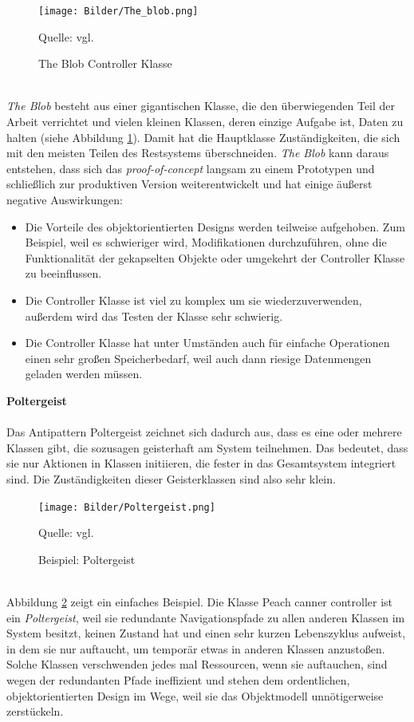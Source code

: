 \documentclass[fontsize=11pt,a4paper,final]{scrreprt}[2003/01/01]
\newcommand*{\quelle}{%
	\footnotesize Quelle: 
}
\begin{document}
\begin{figure}[H]
	\centering
	\texttt{[image: Bilder/The\_blob.png]}
	\caption{The Blob Controller Klasse}
	\quelle{vgl. \cite[S. 43]{Brown1998}}
	\label{fig:The_blob}
\end{figure} \ \\
\textit{The Blob} besteht aus einer gigantischen Klasse, die den überwiegenden Teil der Arbeit verrichtet und vielen kleinen Klassen, deren einzige Aufgabe ist, Daten zu halten (siehe Abbildung \ref{fig:The_blob}). Damit hat die Hauptklasse Zuständigkeiten, die sich mit den meisten Teilen des Restsystems überschneiden. \textit{The Blob} kann daraus entstehen, dass sich das \textit{proof-of-concept} langsam zu einem Prototypen und schließlich zur produktiven Version weiterentwickelt und hat einige äußerst negative Auswirkungen:
\begin{itemize}
	\item Die Vorteile des objektorientierten Designs werden teilweise aufgehoben. Zum Beispiel, weil es schwieriger wird, Modifikationen durchzuführen, ohne die Funktionalität der gekapselten Objekte oder umgekehrt der Controller Klasse zu beeinflussen.
	\item Die Controller Klasse ist viel zu komplex um sie wiederzuverwenden, außerdem wird das Testen der Klasse sehr schwierig.
	\item Die Controller Klasse hat unter Umständen auch für einfache Operationen einen sehr großen Speicherbedarf, weil auch dann riesige Datenmengen geladen werden müssen.
\end{itemize} \newpage \noindent
\textbf{Poltergeist \cite[S. 58 - 61]{Brown1998}} \\ \\
Das Antipattern Poltergeist zeichnet sich dadurch aus, dass es eine oder mehrere Klassen gibt, die sozusagen \glqq geisterhaft\grqq{} am System teilnehmen. Das bedeutet, dass sie nur Aktionen in Klassen initiieren, die fester in das Gesamtsystem integriert sind. Die Zuständigkeiten dieser \glqq Geisterklassen\grqq{} sind also sehr klein.

\begin{figure}[H]
	\centering
	\texttt{[image: Bilder/Poltergeist.png]}
	\caption{Beispiel: Poltergeist}
	\quelle{vgl. \cite[S. 59]{Brown1998}}
	\label{fig:Poltergeist}
\end{figure} \ \\
Abbildung \ref{fig:Poltergeist} zeigt ein einfaches Beispiel. Die Klasse \glqq Peach canner controller\grqq{} ist ein \textit{Poltergeist}, weil sie redundante Navigationspfade zu allen anderen Klassen im System besitzt, keinen Zustand hat und einen sehr kurzen Lebenszyklus aufweist, in dem sie nur auftaucht, um temporär etwas in anderen Klassen anzustoßen. Solche Klassen verschwenden jedes mal Ressourcen, wenn sie auftauchen, sind wegen der redundanten Pfade ineffizient und stehen dem ordentlichen, objektorientierten Design im Wege, weil sie das Objektmodell unnötigerweise zerstückeln. 
\end{document}
